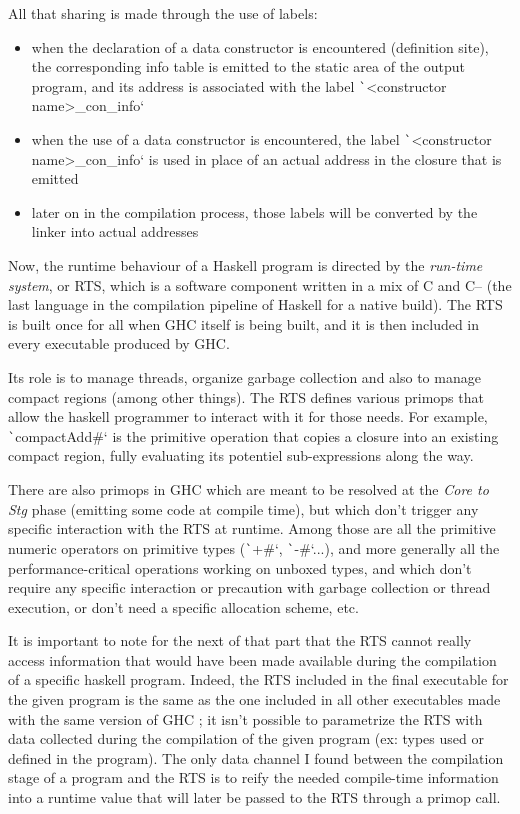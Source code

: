 \documentclass[english]{jflart}
\begin{document}
All that sharing is made through the use of labels:

\begin{itemize}

\item when the declaration of a data constructor is encountered (definition site), the corresponding info table is emitted to the static area of the output program, and its address is associated with the label \texttt`<constructor name>_con_info`
\item when the use of a data constructor is encountered, the label \texttt`<constructor name>_con_info` is used in place of an actual address in the closure that is emitted
\item later on in the compilation process, those labels will be converted by the linker into actual addresses

\end{itemize}

Now, the runtime behaviour of a Haskell program is directed by the \emph{run-time system}, or RTS, which is a software component written in a mix of C and C-- (the last language in the compilation pipeline of Haskell for a native build). The RTS is built once for all when GHC itself is being built, and it is then included in every executable produced by GHC.

Its role is to manage threads, organize garbage collection and also to manage compact regions (among other things). The RTS defines various primops that allow the haskell programmer to interact with it for those needs. For example, \texttt`compactAdd#` is the primitive operation that copies a closure into an existing compact region, fully evaluating its potentiel sub-expressions along the way.

There are also primops in GHC which are meant to be resolved at the \emph{Core to Stg} phase (emitting some code at compile time), but which don't trigger any specific interaction with the RTS at runtime. Among those are all the primitive numeric operators on primitive types (\texttt`+#`, \texttt`-#`...), and more generally all the performance-critical operations working on unboxed types, and which don't require any specific interaction or precaution with garbage collection or thread execution, or don't need a specific allocation scheme, etc.

It is important to note for the next of that part that the RTS cannot really access information that would have been made available during the compilation of a specific haskell program. Indeed, the RTS included in the final executable for the given program is the same as the one included in all other executables made with the same version of GHC ; it isn't possible to parametrize the RTS with data collected during the compilation of the given program (ex: types used or defined in the program). The only data channel I found between the compilation stage of a program and the RTS is to reify the needed compile-time information into a runtime value that will later be passed to the RTS through a primop call.
\end{document}

